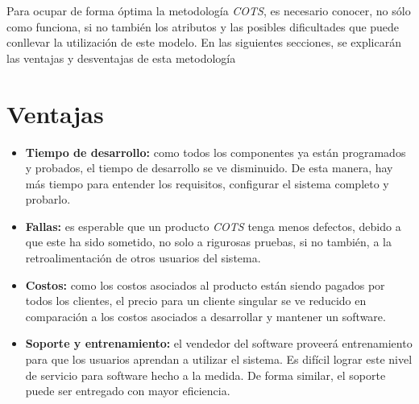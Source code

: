 \documentclass{udpreport}
\begin{document}
Para ocupar de forma óptima la metodología \emph{COTS}, es necesario conocer, no sólo como funciona, si no también los atributos y las posibles dificultades que puede conllevar la utilización de este modelo. En las siguientes secciones, se explicarán las ventajas y desventajas de esta metodología
    \section{Ventajas}
	\begin{itemize}
		\item \textbf{Tiempo de desarrollo:} como todos los componentes ya están programados y probados, el tiempo de desarrollo se ve disminuido. De esta manera, hay más tiempo para entender los requisitos, configurar el sistema completo y probarlo.
		
		\item \textbf{Fallas:} es esperable que un producto \emph{COTS} tenga menos defectos, debido a que este ha sido sometido, no solo a rigurosas pruebas, si no también, a la retroalimentación de otros usuarios del sistema. 
		
		\item \textbf{Costos:} como los costos asociados al producto están siendo pagados por todos los clientes, el precio para un cliente singular se ve reducido en comparación a los costos asociados a desarrollar y mantener un software.
		
		\item \textbf{Soporte y entrenamiento:} el vendedor del software proveerá entrenamiento para que los usuarios aprendan a utilizar el sistema. Es difícil lograr este nivel de servicio para software hecho a la medida. De forma similar, el soporte  puede ser entregado con mayor eficiencia.
		
	\end{itemize}
\end{document}
